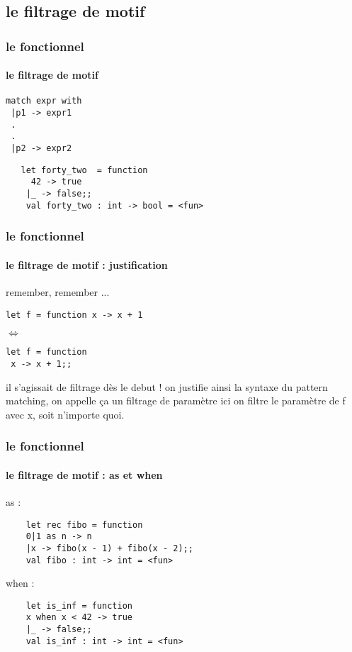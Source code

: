       \subsection{le filtrage de motif}
\begin{frame}[fragile]
  \frametitle{le fonctionnel}
  \framesubtitle{le filtrage de motif}
  \begin{minipage}[t]{5cm}
    \begin{lstlisting}
match expr with
 |p1 -> expr1
 .
 .
 |p2 -> expr2
 \end{lstlisting}
 \end{minipage}
 \begin{minipage}[t]{8cm}
   \begin{lstlisting}
   let forty_two  = function
     42 -> true
    |_ -> false;;
    val forty_two : int -> bool = <fun>
   \end{lstlisting} 
 \end{minipage}
\end{frame}
\begin{frame}[fragile]
  \frametitle{le fonctionnel}
  \framesubtitle{le filtrage de motif : justification}
remember, remember ...
\begin{lstlisting}
let f = function x -> x + 1 
\end{lstlisting}
\begin{center}
\begin{rotate}{90}
$\Leftrightarrow$
\end{rotate}
\end{center}
\begin{lstlisting}
let f = function 
 x -> x + 1;;
 \end{lstlisting}
  il s'agissait de filtrage dès le debut ! on justifie ainsi la syntaxe du pattern matching, 
  on appelle ça un filtrage de paramètre ici on filtre le paramètre de f avec x, soit n'importe quoi.
\end{frame}
\begin{frame}[fragile]
  \frametitle{le fonctionnel}
  \framesubtitle{le filtrage de motif : as et when}
  \begin{itemize}
  \begin{minipage}[t]{5cm}
  \item
    as :
    \begin{lstlisting}
	let rec fibo = function 
 	0|1 as n -> n 
 	|x -> fibo(x - 1) + fibo(x - 2);; 
	val fibo : int -> int = <fun>
    \end{lstlisting}
  \end{minipage}
  \begin{minipage}[t]{5cm}
  \item
    when :
    \begin{lstlisting}
	let is_inf = function 
  	x when x < 42 -> true
 	|_ -> false;;
	val is_inf : int -> int = <fun>
    \end{lstlisting}
  \end{minipage}
  \end{itemize}
\end{frame}
